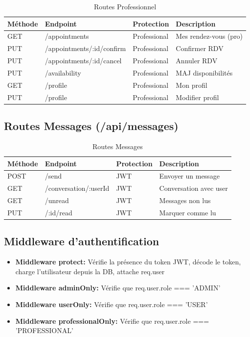 \documentclass[12pt,a4paper]{article}
\begin{document}
\begin{table}[h]
\centering
\begin{tabular}{|l|l|l|p{4cm}|}
\hline
\textbf{Méthode} & \textbf{Endpoint} & \textbf{Protection} & \textbf{Description} \\
\hline
GET & /appointments & Professional & Mes rendez-vous (pro) \\
PUT & /appointments/:id/confirm & Professional & Confirmer RDV \\
PUT & /appointments/:id/cancel & Professional & Annuler RDV \\
PUT & /availability & Professional & MAJ disponibilités \\
GET & /profile & Professional & Mon profil \\
PUT & /profile & Professional & Modifier profil \\
\hline
\end{tabular}
\caption{Routes Professionnel}
\end{table}

\subsection{Routes Messages (/api/messages)}

\begin{table}[h]
\centering
\begin{tabular}{|l|l|l|p{4cm}|}
\hline
\textbf{Méthode} & \textbf{Endpoint} & \textbf{Protection} & \textbf{Description} \\
\hline
POST & /send & JWT & Envoyer un message \\
GET & /conversation/:userId & JWT & Conversation avec user \\
GET & /unread & JWT & Messages non lus \\
PUT & /:id/read & JWT & Marquer comme lu \\
\hline
\end{tabular}
\caption{Routes Messages}
\end{table}

\subsection{Middleware d'authentification}

\begin{itemize}
    \item \textbf{Middleware protect:} Vérifie la présence du token JWT, décode le token, charge l'utilisateur depuis la DB, attache req.user
    \item \textbf{Middleware adminOnly:} Vérifie que req.user.role === 'ADMIN'
    \item \textbf{Middleware userOnly:} Vérifie que req.user.role === 'USER'
    \item \textbf{Middleware professionalOnly:} Vérifie que req.user.role === 'PROFESSIONAL'
\end{itemize}
\end{document}
